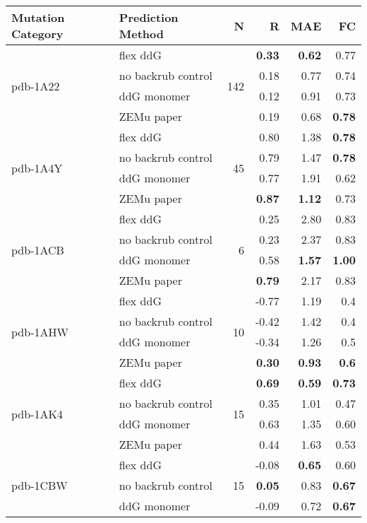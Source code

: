 {
\small
\begin{longtable}{llrrrr}
\toprule
Mutation Category &   Prediction Method &   N &     R &  MAE &   FC \\
\midrule
 \multirow{ 4}{*}{pdb-1A22} & flex ddG & \multirow{ 4}{*}{142} & \textbf{0.33} & \textbf{0.62} & 0.77  \\
 & no backrub control & & 0.18 & 0.77 & 0.74  \\
 & ddG monomer & & 0.12 & 0.91 & 0.73  \\
 & ZEMu paper & & 0.19 & 0.68 & \textbf{0.78}  \\
\hline
 \multirow{ 4}{*}{pdb-1A4Y} & flex ddG & \multirow{ 4}{*}{45} & 0.80 & 1.38 & \textbf{0.78}  \\
 & no backrub control & & 0.79 & 1.47 & \textbf{0.78}  \\
 & ddG monomer & & 0.77 & 1.91 & 0.62  \\
 & ZEMu paper & & \textbf{0.87} & \textbf{1.12} & 0.73  \\
\hline
 \multirow{ 4}{*}{pdb-1ACB} & flex ddG & \multirow{ 4}{*}{6} & 0.25 & 2.80 & 0.83  \\
 & no backrub control & & 0.23 & 2.37 & 0.83  \\
 & ddG monomer & & 0.58 & \textbf{1.57} & \textbf{1.00}  \\
 & ZEMu paper & & \textbf{0.79} & 2.17 & 0.83  \\
\hline
 \multirow{ 4}{*}{pdb-1AHW} & flex ddG & \multirow{ 4}{*}{10} & -0.77 & 1.19 & 0.4  \\
 & no backrub control & & -0.42 & 1.42 & 0.4  \\
 & ddG monomer & & -0.34 & 1.26 & 0.5  \\
 & ZEMu paper & & \textbf{0.30} & \textbf{0.93} & \textbf{0.6}  \\
\hline
 \multirow{ 4}{*}{pdb-1AK4} & flex ddG & \multirow{ 4}{*}{15} & \textbf{0.69} & \textbf{0.59} & \textbf{0.73}  \\
 & no backrub control & & 0.35 & 1.01 & 0.47  \\
 & ddG monomer & & 0.63 & 1.35 & 0.60  \\
 & ZEMu paper & & 0.44 & 1.63 & 0.53  \\
\hline
 \multirow{ 4}{*}{pdb-1CBW} & flex ddG & \multirow{ 4}{*}{15} & -0.08 & \textbf{0.65} & 0.60  \\
 & no backrub control & & \textbf{0.05} & 0.83 & \textbf{0.67}  \\
 & ddG monomer & & -0.09 & 0.72 & \textbf{0.67}  \\

\end{longtable}}
